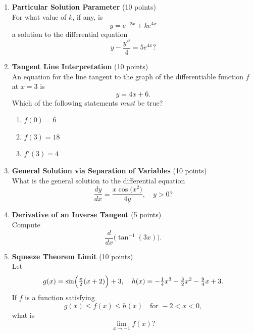 \begin{enumerate}
  \item \textbf{Particular Solution Parameter} (10 points)\\
  For what value of $k$, if any, is
  \[
    y = e^{-2x} + k e^{4x}
  \]
  a solution to the differential equation
  \[
    y - \frac{y''}{4} = 5 e^{4x}?
  \]
  \begin{subanswer}
  \end{subanswer}

  \item \textbf{Tangent Line Interpretation} (10 points)\\
  An equation for the line tangent to the graph of the differentiable function $f$ at $x = 3$ is
  \[
    y = 4x + 6.
  \]
  Which of the following statements \emph{must} be true?\\
  \begin{enumerate}[label=(\Roman*)]
    \item $f(0) = 6$
    \item $f(3) = 18$
    \item $f'(3) = 4$
  \end{enumerate}
  \begin{subanswer}
  \end{subanswer}

  \item \textbf{General Solution via Separation of Variables} (10 points)\\
  What is the general solution to the differential equation
  \[
    \frac{dy}{dx} = \frac{x \cos\bigl(x^2\bigr)}{4y},
    \quad y > 0?
  \]
  \begin{subanswer}
  \end{subanswer}

  \item \textbf{Derivative of an Inverse Tangent} (5 points)\\
  Compute
  \[
    \frac{d}{dx}\bigl(\tan^{-1}(3x)\bigr).
  \]
  \begin{subanswer}
  \end{subanswer}

  \item \textbf{Squeeze Theorem Limit} (10 points)\\
  Let
  \[
    g(x) = \sin\Bigl(\tfrac{\pi}{2}(x+2)\Bigr) + 3,\quad
    h(x) = -\tfrac{1}{4}x^3 - \tfrac{3}{2}x^2 - \tfrac{9}{4}x + 3.
  \]
  If $f$ is a function satisfying
  \[
    g(x) \le f(x) \le h(x)
    \quad\text{for } -2 < x < 0,
  \]
  what is
  \[
    \lim_{x \to -1} f(x)?
  \]
  \begin{subanswer}
  \end{subanswer}


\end{enumerate}
